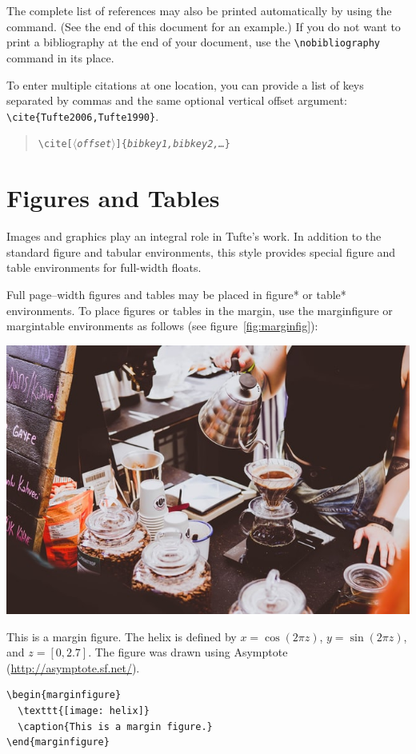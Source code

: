 \documentclass{tufte-handout}
\newcommand{\doccmd}[1]{\texttt{\textbackslash#1}}%
\newcommand{\docopt}[1]{\ensuremath{\langle}\textrm{\textit{#1}}\ensuremath{\rangle}}%
\newcommand{\docarg}[1]{\textrm{\textit{#1}}}%
\newcommand{\docenv}[1]{\textsf{#1}}%
\newenvironment{docspec}{\begin{quote}\noindent}{\end{quote}}%
\begin{document}
The complete list of references may also be printed automatically by using
the \Verb|| command.  (See the end of this document for an
example.)  If you do not want to print a bibliography at the end of your
document, use the \Verb|\nobibliography| command in its place.  

To enter multiple citations at one location,\cite{Tufte2006,Tufte1990} you can
provide a list of keys separated by commas and the same optional vertical
offset argument: \Verb|\cite{Tufte2006,Tufte1990}|.  
\begin{docspec}
  \doccmd{cite[\docopt{offset}]\{\docarg{bibkey1,bibkey2,\ldots}\}}
\end{docspec}

\section{Figures and Tables}\label{sec:figures-and-tables}
Images and graphics play an integral role in Tufte's work.
In addition to the standard \docenv{figure} and \docenv{tabular} environments,
this style provides special figure and table environments for full-width
floats.

Full page--width figures and tables may be placed in \docenv{figure*} or
\docenv{table*} environments.  To place figures or tables in the margin,
use the \docenv{marginfigure} or \docenv{margintable} environments as follows
(see figure~\ref{fig:marginfig}):

\begin{marginfigure}%
  \includegraphics[width=\linewidth]{sample}
  \caption{This is a margin figure.  The helix is defined by 
    $x = \cos(2\pi z)$, $y = \sin(2\pi z)$, and $z = [0, 2.7]$.  The figure was
    drawn using Asymptote (\url{http://asymptote.sf.net/}).}
  \label{fig:marginfig}
\end{marginfigure}
\begin{Verbatim}
\begin{marginfigure}
  \texttt{[image: helix]}
  \caption{This is a margin figure.}
\end{marginfigure}
\end{Verbatim}
\end{document}
